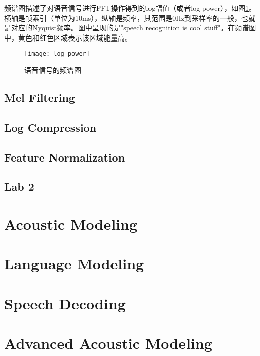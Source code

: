 频谱图描述了对语音信号进行FFT操作得到的log幅值（或者log-power），如图\ref{fig:log-power}。横轴是帧索引（单位为10ms），纵轴是频率，其范围是0Hz到采样率的一般，也就是对应的Nyquist频率。图中呈现的是"speech recognition is cool stuff"。在频谱图中，黄色和红色区域表示该区域能量高。
\begin{figure}[htbp]
  \centering
  \texttt{[image: log-power]}
  \caption{语音信号的频谱图 \label{fig:log-power}}
\end{figure}



\subsection{Mel Filtering} %
\label{sub:mel_filtering}


\subsection{Log Compression} %
\label{sub:log_compression}


\subsection{Feature Normalization} %
\label{sub:feature_normalization}


\subsection{Lab 2} %
\label{sub:lab_2}


\section{Acoustic Modeling}

\section{Language Modeling}

\section{Speech Decoding}

\section{Advanced Acoustic Modeling}